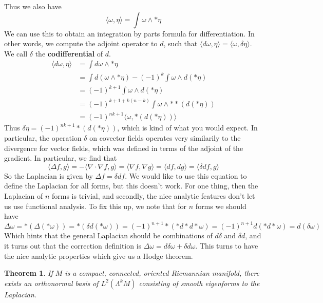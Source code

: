 \documentclass{article}
\theoremstyle{plain}
\newtheorem{theorem}{Theorem}
\theoremstyle{remark}
\theoremstyle{definition}
\begin{document}
Thus we also have
%
\[ \langle \omega, \eta \rangle = \int \omega \wedge * \eta \]
%
We can use this to obtain an integration by parts formula for differentiation. In other words, we compute the adjoint operator to $d$, such that $\langle d\omega, \eta \rangle = \langle \omega, \delta \eta \rangle$. We call $\delta$ the {\bf codifferential} of $d$.
%
\begin{align*}
    \langle d\omega, \eta \rangle &= \int d\omega \wedge *\eta\\
    &= \int d(\omega \wedge *\eta) - (-1)^k \int \omega \wedge d(* \eta)\\
    &= (-1)^{k+1} \int \omega \wedge d(* \eta)\\
    &= (-1)^{k+1 + k(n-k)} \int \omega \wedge **(d(* \eta))\\
    &= (-1)^{nk+1} \langle \omega, *(d(* \eta)) \rangle
\end{align*}
%
Thus $\delta \eta = (-1)^{nk+1} *(d(* \eta))$, which is kind of what you would expect. In particular, the operation $\delta$ on covector fields operates very similarily to the divergence for vector fields, which was defined in terms of the adjoint of the gradient. In particular, we find that
%
\[ \langle \Delta f, g \rangle = - \langle \nabla \cdot \nabla f, g \rangle = \langle \nabla f, \nabla g \rangle = \langle df, dg \rangle = \langle \delta df, g \rangle \]
%
So the Laplacian is given by $\Delta f = \delta df$. We would like to use this equation to define the Laplacian for all forms, but this doesn't work. For one thing, then the Laplacian of $n$ forms is trivial, and secondly, the nice analytic features don't let us use functional analysis. To fix this up, we note that for $n$ forms we should have
%
\[ \Delta \omega = *(\Delta(* \omega)) = *(\delta d(* \omega)) = (-1)^{n+1} *(* d * d * \omega) = (-1)^{n+1} d(* d * \omega) = d(\delta \omega) \]
%
Which hints that the general Laplacian should be combinations of $d \delta$ and $\delta d$, and it turns out that the correction definition is $\Delta \omega = d \delta \omega + \delta d \omega$. This turns to have the nice analytic properties which give us a Hodge theorem.

\begin{theorem}
    If $M$ is a compact, connected, oriented Riemannian manifold, there exists an orthonormal basis of $L^2(\Lambda^k M)$ consisting of smooth eigenforms to the Laplacian.
\end{theorem}
\end{document}
